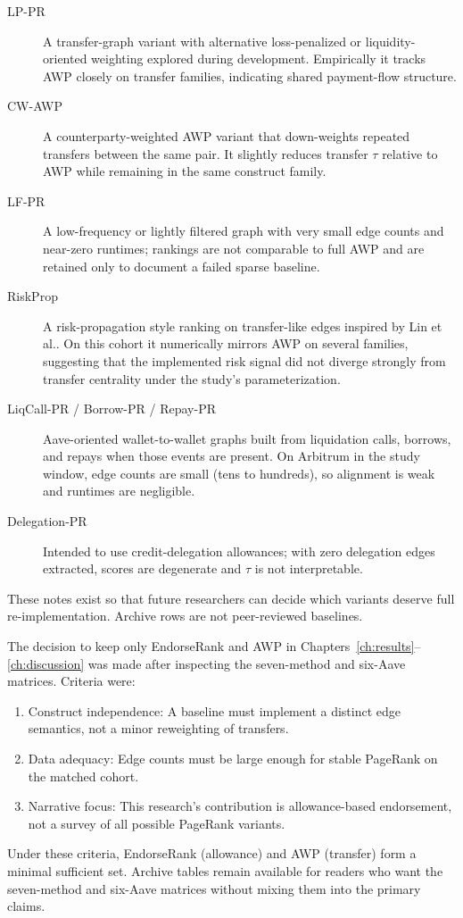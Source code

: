\begin{description}
\item[LP-PR] A transfer-graph variant with alternative loss-penalized or liquidity-oriented weighting explored during development. Empirically it tracks AWP closely on transfer families, indicating shared payment-flow structure.
\item[CW-AWP] A counterparty-weighted AWP variant that down-weights repeated transfers between the same pair. It slightly reduces transfer $\tau$ relative to AWP while remaining in the same construct family.
\item[LF-PR] A low-frequency or lightly filtered graph with very small edge counts and near-zero runtimes; rankings are not comparable to full AWP and are retained only to document a failed sparse baseline.
\item[RiskProp] A risk-propagation style ranking on transfer-like edges inspired by Lin et al.. On this cohort it numerically mirrors AWP on several families, suggesting that the implemented risk signal did not diverge strongly from transfer centrality under the study's parameterization.
\item[LiqCall-PR / Borrow-PR / Repay-PR] Aave-oriented wallet-to-wallet graphs built from liquidation calls, borrows, and repays when those events are present. On Arbitrum in the study window, edge counts are small (tens to hundreds), so alignment is weak and runtimes are negligible.
\item[Delegation-PR] Intended to use credit-delegation allowances; with zero delegation edges extracted, scores are degenerate and $\tau$ is not interpretable.
\end{description}

These notes exist so that future researchers can decide which variants deserve full re-implementation. Archive rows are not peer-reviewed baselines.


The decision to keep only EndorseRank and AWP in Chapters~\ref{ch:results}--\ref{ch:discussion} was made after inspecting the seven-method and six-Aave matrices. Criteria were:

\begin{enumerate}
\item Construct independence: A baseline must implement a distinct edge semantics, not a minor reweighting of transfers.
\item Data adequacy: Edge counts must be large enough for stable PageRank on the matched cohort.
\item Narrative focus: This research's contribution is allowance-based endorsement, not a survey of all possible PageRank variants.
\end{enumerate}

Under these criteria, EndorseRank (allowance) and AWP (transfer) form a minimal sufficient set. Archive tables remain available for readers who want the seven-method and six-Aave matrices without mixing them into the primary claims.

